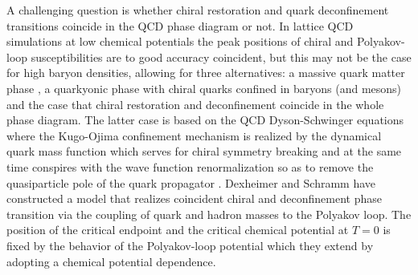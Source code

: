 \documentclass{webofc}
\begin{document}
A challenging question is whether chiral restoration and quark deconfinement transitions coincide in the QCD phase diagram or not. In lattice QCD simulations at low chemical potentials the peak positions of chiral and Polyakov-loop susceptibilities are to good accuracy coincident, but this may not be the case for high baryon densities, allowing for three alternatives: a massive quark matter phase  \cite{Schulz:1987qg,Castorina:2008vu}, a quarkyonic phase \cite{McLerran:2007qj,Andronic:2009gj}  with chiral quarks confined in baryons (and mesons) and the case that chiral restoration and deconfinement coincide in the  
whole phase diagram.
The latter case is based on the QCD Dyson-Schwinger equations where the Kugo-Ojima confinement mechanism is realized by the dynamical quark mass function which serves for chiral symmetry breaking and at the same time conspires with the wave function renormalization so as to remove the quasiparticle pole of the quark propagator \cite{Blaschke:1997bj,Roberts:2000aa}.
%
Dexheimer and Schramm \cite{Dexheimer:2009va} have constructed a model that realizes coincident chiral and deconfinement phase transition via the coupling of quark and hadron masses to the Polyakov loop. The position of the critical endpoint and the critical chemical potential at $T=0$ is fixed by the behavior of the Polyakov-loop potential which they extend by adopting a chemical potential dependence. 
\end{document}
